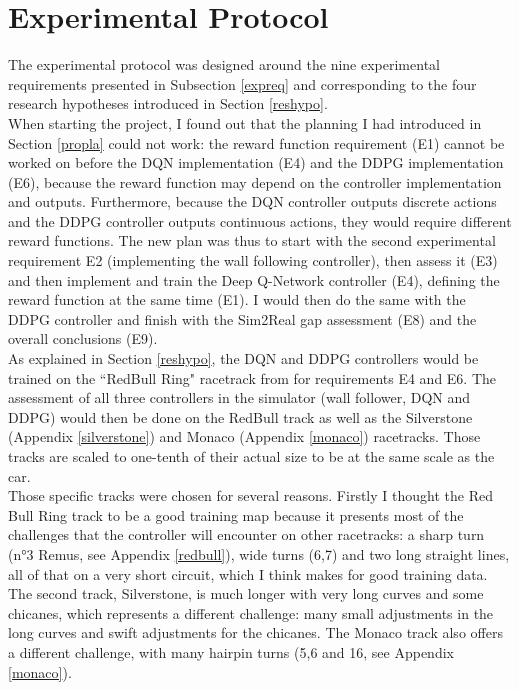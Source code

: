 
\chapter{Experimental Protocol} %

\label{Chapter6} %



The experimental protocol was designed around the nine experimental requirements presented in Subsection \ref{expreq} and corresponding to the four research hypotheses introduced in Section \ref{reshypo}. \\
When starting the project, I found out that the planning I had introduced in Section \ref{propla} could not work: the reward function requirement (E1) cannot be worked on before the DQN implementation (E4) and the DDPG implementation (E6), because the reward function may depend on the controller implementation and outputs. Furthermore, because the DQN controller outputs discrete actions and the DDPG controller outputs continuous actions, they would require different reward functions. The new plan was thus to start with the second experimental requirement E2 (implementing the wall following controller), then assess it (E3) and then implement and train the Deep Q-Network controller (E4), defining the reward function at the same time (E1). I would then do the same with the DDPG controller and finish with the Sim2Real gap assessment (E8) and the overall conclusions (E9). \\
As explained in Section \ref{reshypo}, the DQN and DDPG controllers would be trained on the ``RedBull Ring" racetrack from \cite{bosello} for requirements E4 and E6. The assessment of all three controllers in the simulator (wall follower, DQN and DDPG) would then be done on the RedBull track as well as the Silverstone (Appendix \ref{silverstone}) and Monaco (Appendix \ref{monaco}) racetracks. Those tracks are scaled to one-tenth of their actual size to be at the same scale as the car. \\
Those specific tracks were chosen for several reasons. Firstly I thought the Red Bull Ring track to be a good training map because it presents most of the challenges that the controller will encounter on other racetracks: a sharp turn (n°3 Remus, see Appendix \ref{redbull}), wide turns (6,7) and two long straight lines, all of that on a very short circuit, which I think makes for good training data. The second track, Silverstone, is much longer with very long curves and some chicanes, which represents a different challenge: many small adjustments in the long curves and swift adjustments for the chicanes. The Monaco track also offers a different challenge, with many hairpin turns (5,6 and 16, see Appendix \ref{monaco}). \\
